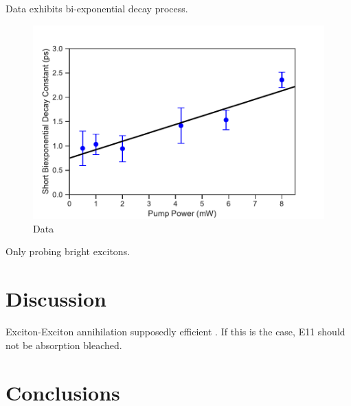 Data exhibits bi-exponential decay process.

\begin{figure}[H]
	\centering
	\includegraphics[scale=0.8]{images/chapter_my_data/shorter_biexpconst_fit}
	\caption{Data}
\end{figure}

Only probing bright excitons.

\section{Discussion}
Exciton-Exciton annihilation supposedly efficient \cite{murakami2009existence}. If this is the case, E11 should not be absorption bleached.


\section{Conclusions}
